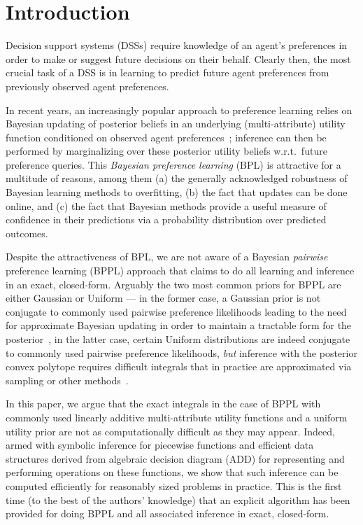 \documentclass[letterpaper]{article}
\begin{document}
\section{Introduction}

\label{sec:intro}

Decision support systems (DSSs) require knowledge of an agent's
preferences in order to make or suggest future decisions on their
behalf.  Clearly then, the most crucial task of a DSS is in learning to
predict future agent preferences from previously observed agent preferences.

In recent years, an increasingly popular approach to preference
learning relies on Bayesian updating of posterior beliefs in an
underlying (multi-attribute) utility function conditioned on observed
agent
preferences~\cite{Chajewska00utilitiesas,Chajewska01learningan,boutilier02239,zoubin_gp,sanner:aistats10,viappiani_nips};
inference can then be performed by marginalizing over these posterior
utility beliefs w.r.t.\ future preference queries.  This \emph{Bayesian
preference learning} (BPL) is attractive for a multitude of reasons,
among them (a) the generally acknowledged robustness of Bayesian
learning methods to overfitting, (b) the fact that updates can be done
online, and (c) the fact that Bayesian methods provide a useful
measure of confidence in their predictions via a probability
distribution over predicted outcomes.

Despite the attractiveness of BPL, we are not aware of a Bayesian
\emph{pairwise} preference learning (BPPL) approach that claims to do
all learning and inference in an exact, closed-form.  Arguably the two
most common priors for BPPL are either Gaussian or Uniform --- in the
former case, a Gaussian prior is not conjugate to commonly used
pairwise preference likelihoods leading to the need for approximate
Bayesian updating in order to maintain a tractable form for the
posterior~\cite{Chajewska00utilitiesas,boutilier02239,zoubin_gp,sanner:aistats10}, in
the latter case, certain Uniform distributions are indeed conjugate to
commonly used pairwise preference likelihoods, \emph{but} inference
with the posterior convex polytope requires difficult integrals 
that in practice are approximated via sampling or other
methods~\cite{Chajewska01learningan,viappiani_nips}.

In this paper, we argue that the exact integrals in the case of BPPL
with commonly used linearly additive multi-attribute utility functions
and a uniform utility prior are not as computationally difficult as
they may appear.  Indeed, armed with symbolic inference for piecewise
functions and efficient data structures derived from algebraic
decision diagram (ADD) for representing and performing operations on
these functions, we show that such inference can be computed
efficiently for reasonably sized problems in practice.
This is the first time (to the best of the authors' knowledge) that an
explicit algorithm has been provided for doing BPPL and all associated
inference in exact, closed-form.
\end{document}
